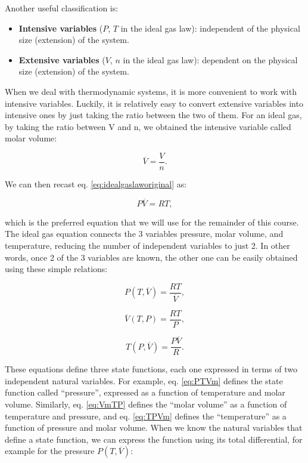 \documentclass[
  9pt,
]{extbook}
\providecommand{\tightlist}{%
  \setlength{\itemsep}{0pt}\setlength{\parskip}{0pt}}
\theoremstyle{definition}
\theoremstyle{definition}
\theoremstyle{definition}
\theoremstyle{remark}
\begin{document}
Another useful classification is:

\begin{itemize}
\tightlist
\item
  \textbf{Intensive variables} (\(P\), \(T\) in the ideal gas law): independent of the physical size (extension) of the system.
\item
  \textbf{Extensive variables} (\(V\), \(n\) in the ideal gas law): dependent on the physical size (extension) of the system.
\end{itemize}

When we deal with thermodynamic systems, it is more convenient to work with intensive variables. Luckily, it is relatively easy to convert extensive variables into intensive ones by just taking the ratio between the two of them. For an ideal gas, by taking the ratio between V and n, we obtained the intensive variable called molar volume:

\begin{equation}
  \overline{V}=\frac{V}{n}.   
  \label{eq:Vmdef}
\end{equation}

We can then recast eq. \eqref{eq:idealgaslaworiginal} as:

\begin{equation}
  P\overline{V}=RT,
  \label{eq:idealgaslaw}
\end{equation}

which is the preferred equation that we will use for the remainder of this course.
The ideal gas equation connects the 3 variables pressure, molar volume, and temperature, reducing the number of independent variables to just 2. In other words, once 2 of the 3 variables are known, the other one can be easily obtained using these simple relations:

\begin{equation}
  P(T,\overline{V})=\frac{RT}{\overline{V}},
  \label{eq:PTVm}
\end{equation}

\begin{equation}
  \overline{V}(T,P)=\frac{RT}{P},
  \label{eq:VmTP}
 \end{equation}

\begin{equation}
  T(P,\overline{V})=\frac{P\overline{V}}{R}.
  \label{eq:TPVm}
\end{equation}

These equations define three state functions, each one expressed in terms of two independent natural variables. For example, eq. \eqref{eq:PTVm} defines the state function called ``pressure'', expressed as a function of temperature and molar volume. Similarly, eq. \eqref{eq:VmTP} defines the ``molar volume'' as a function of temperature and pressure, and eq. \eqref{eq:TPVm} defines the ``temperature'' as a function of pressure and molar volume. When we know the natural variables that define a state function, we can express the function using its total differential, for example for the pressure \(P(T, \overline{V})\):
\end{document}
